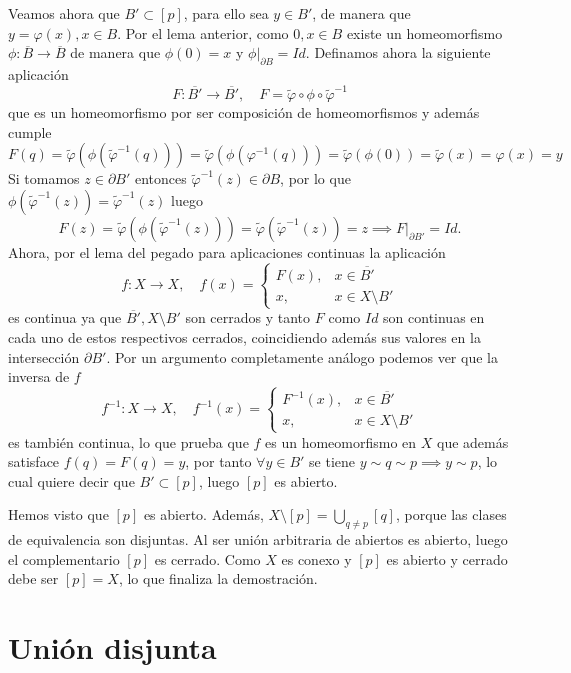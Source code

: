 {    Veamos ahora que $B'\subset[p]$, para ello sea $y\in B'$, de manera que $y=\varphi(x), x\in B$. Por el lema anterior, como $0,x\in B$ existe un homeomorfismo $\phi:\overline{B}\to\overline{B}$ de manera que $\phi(0)=x$ y $\phi|_{\partial B}=Id.$
    Definamos ahora la siguiente aplicación
    \[
    F:\overline{B'}\to\overline{B'},\quad F=\tilde{\varphi}\circ\phi\circ\tilde{\varphi}^{-1}
    \]
    que es un homeomorfismo por ser composición de homeomorfismos y además cumple
    \[
    F(q)=\tilde{\varphi}(\phi(\tilde{\varphi}^{-1}(q)))=\tilde{\varphi}(\phi({\varphi}^{-1}(q)))=\tilde{\varphi}(\phi(0))=\tilde{\varphi}(x)=\varphi(x)=y
    \]
    Si tomamos $z\in{\partial B'}$ entonces $\tilde{\varphi}^{-1}(z)\in \partial B$, por lo que $\phi(\tilde{\varphi}^{-1}(z))=\tilde{\varphi}^{-1}(z)$ luego
    \[
    F(z)=\tilde{\varphi}(\phi(\tilde{\varphi}^{-1}(z)))=\tilde{\varphi}(\tilde{\varphi}^{-1}(z))=z \implies F|_{\partial B'}=Id.
    \]
    Ahora, por el lema del pegado para aplicaciones continuas la aplicación
    \[
    f:X\to X,\quad f(x)=
    \begin{cases}
        F(x), & x \in \overline{B'} \\
        x, & x \in X\setminus B'
    \end{cases}
    \]
    es continua ya que $\overline{B'},X\setminus B'$ son cerrados y tanto $F$ como $Id$ son continuas en cada uno de estos respectivos cerrados, coincidiendo además sus valores en la intersección $\partial B'$. Por un argumento completamente análogo podemos ver que la inversa de $f$
    \[
    f^{-1}:X\to X,\quad f^{-1}(x)=
    \begin{cases}
        F^{-1}(x), & x \in \overline{B'} \\
        x, & x \in X\setminus B'
    \end{cases}
    \]
    es también continua, lo que prueba que $f$ es un homeomorfismo en $X$ que además satisface $f(q)=F(q)=y$, por tanto $\forall y\in B'$ se tiene $y\sim q\sim p\implies y\sim p$, lo cual quiere decir que $B'\subset [p]$, luego $[p]$ es abierto.

    Hemos visto que $[p]$ es abierto. Además, $X\setminus[p] = \bigcup_{q \ne p} [q]$, porque las clases de equivalencia son disjuntas. Al ser unión arbitraria de abiertos es abierto, luego el complementario $[p]$ es cerrado. Como $X$ es conexo y $[p]$ es abierto y cerrado debe ser $[p]=X$, lo que finaliza la demostración.
}

\clearpage

\section{Unión disjunta}

